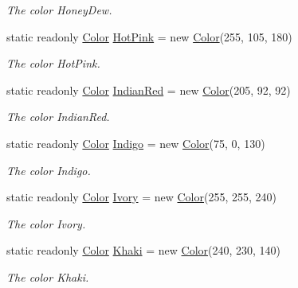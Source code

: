 \begin{DoxyCompactItemize}
\begin{DoxyCompactList}\small\item\em The color Honey\-Dew. \end{DoxyCompactList}\item 
static readonly \hyperlink{struct_tri_devs_1_1_tri_engine2_d_1_1_color}{Color} \hyperlink{struct_tri_devs_1_1_tri_engine2_d_1_1_color_a9fad7abf1e4034c747aa13f660eac3b8}{Hot\-Pink} = new \hyperlink{struct_tri_devs_1_1_tri_engine2_d_1_1_color}{Color}(255, 105, 180)
\begin{DoxyCompactList}\small\item\em The color Hot\-Pink. \end{DoxyCompactList}\item 
static readonly \hyperlink{struct_tri_devs_1_1_tri_engine2_d_1_1_color}{Color} \hyperlink{struct_tri_devs_1_1_tri_engine2_d_1_1_color_a84329299011e48d1bcd7f6736ff5a38c}{Indian\-Red} = new \hyperlink{struct_tri_devs_1_1_tri_engine2_d_1_1_color}{Color}(205, 92, 92)
\begin{DoxyCompactList}\small\item\em The color Indian\-Red. \end{DoxyCompactList}\item 
static readonly \hyperlink{struct_tri_devs_1_1_tri_engine2_d_1_1_color}{Color} \hyperlink{struct_tri_devs_1_1_tri_engine2_d_1_1_color_a232bdfc4e6f644b4b5da96643fb5f185}{Indigo} = new \hyperlink{struct_tri_devs_1_1_tri_engine2_d_1_1_color}{Color}(75, 0, 130)
\begin{DoxyCompactList}\small\item\em The color Indigo. \end{DoxyCompactList}\item 
static readonly \hyperlink{struct_tri_devs_1_1_tri_engine2_d_1_1_color}{Color} \hyperlink{struct_tri_devs_1_1_tri_engine2_d_1_1_color_a8df91dfe5df57c6a53f1e78776220b51}{Ivory} = new \hyperlink{struct_tri_devs_1_1_tri_engine2_d_1_1_color}{Color}(255, 255, 240)
\begin{DoxyCompactList}\small\item\em The color Ivory. \end{DoxyCompactList}\item 
static readonly \hyperlink{struct_tri_devs_1_1_tri_engine2_d_1_1_color}{Color} \hyperlink{struct_tri_devs_1_1_tri_engine2_d_1_1_color_a9720a3adfdfa22b17562ec5a6693b7b1}{Khaki} = new \hyperlink{struct_tri_devs_1_1_tri_engine2_d_1_1_color}{Color}(240, 230, 140)
\begin{DoxyCompactList}\small\item\em The color Khaki. \end{DoxyCompactList}\item 

\end{DoxyCompactItemize}
